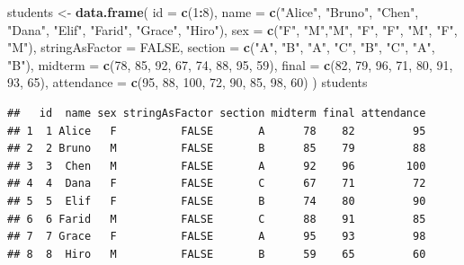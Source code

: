 \documentclass[
]{article}
\newenvironment{Shaded}{\begin{snugshade}}{\end{snugshade}}
\newcommand{\AttributeTok}[1]{\textcolor[rgb]{0.13,0.29,0.53}{#1}}
\newcommand{\ConstantTok}[1]{\textcolor[rgb]{0.56,0.35,0.01}{#1}}
\newcommand{\DecValTok}[1]{\textcolor[rgb]{0.00,0.00,0.81}{#1}}
\newcommand{\FunctionTok}[1]{\textcolor[rgb]{0.13,0.29,0.53}{\textbf{#1}}}
\newcommand{\NormalTok}[1]{#1}
\newcommand{\OtherTok}[1]{\textcolor[rgb]{0.56,0.35,0.01}{#1}}
\newcommand{\SpecialCharTok}[1]{\textcolor[rgb]{0.81,0.36,0.00}{\textbf{#1}}}
\newcommand{\StringTok}[1]{\textcolor[rgb]{0.31,0.60,0.02}{#1}}
\begin{document}
\begin{Shaded}
\begin{Highlighting}[]
\NormalTok{students }\OtherTok{\textless{}{-}} \FunctionTok{data.frame}\NormalTok{(}
  \AttributeTok{id =} \FunctionTok{c}\NormalTok{(}\DecValTok{1}\SpecialCharTok{:}\DecValTok{8}\NormalTok{),}
  \AttributeTok{name =} \FunctionTok{c}\NormalTok{(}\StringTok{"Alice"}\NormalTok{, }\StringTok{"Bruno"}\NormalTok{, }\StringTok{"Chen"}\NormalTok{, }\StringTok{"Dana"}\NormalTok{, }\StringTok{"Elif"}\NormalTok{, }\StringTok{"Farid"}\NormalTok{, }\StringTok{"Grace"}\NormalTok{, }\StringTok{"Hiro"}\NormalTok{),}
  \AttributeTok{sex =} \FunctionTok{c}\NormalTok{(}\StringTok{"F"}\NormalTok{, }\StringTok{"M"}\NormalTok{,}\StringTok{"M"}\NormalTok{,  }\StringTok{"F"}\NormalTok{, }\StringTok{"F"}\NormalTok{, }\StringTok{"M"}\NormalTok{, }\StringTok{"F"}\NormalTok{, }\StringTok{"M"}\NormalTok{), }\AttributeTok{stringAsFactor =} \ConstantTok{FALSE}\NormalTok{, }
  \AttributeTok{section =} \FunctionTok{c}\NormalTok{(}\StringTok{"A"}\NormalTok{, }\StringTok{"B"}\NormalTok{, }\StringTok{"A"}\NormalTok{, }\StringTok{"C"}\NormalTok{, }\StringTok{"B"}\NormalTok{, }\StringTok{"C"}\NormalTok{, }\StringTok{"A"}\NormalTok{, }\StringTok{"B"}\NormalTok{),}
  \AttributeTok{midterm =} \FunctionTok{c}\NormalTok{(}\DecValTok{78}\NormalTok{, }\DecValTok{85}\NormalTok{, }\DecValTok{92}\NormalTok{, }\DecValTok{67}\NormalTok{, }\DecValTok{74}\NormalTok{, }\DecValTok{88}\NormalTok{, }\DecValTok{95}\NormalTok{, }\DecValTok{59}\NormalTok{),}
  \AttributeTok{final =} \FunctionTok{c}\NormalTok{(}\DecValTok{82}\NormalTok{, }\DecValTok{79}\NormalTok{, }\DecValTok{96}\NormalTok{, }\DecValTok{71}\NormalTok{, }\DecValTok{80}\NormalTok{, }\DecValTok{91}\NormalTok{, }\DecValTok{93}\NormalTok{, }\DecValTok{65}\NormalTok{),}
  \AttributeTok{attendance =} \FunctionTok{c}\NormalTok{(}\DecValTok{95}\NormalTok{, }\DecValTok{88}\NormalTok{, }\DecValTok{100}\NormalTok{, }\DecValTok{72}\NormalTok{, }\DecValTok{90}\NormalTok{, }\DecValTok{85}\NormalTok{, }\DecValTok{98}\NormalTok{, }\DecValTok{60}\NormalTok{)}
\NormalTok{)}
\NormalTok{students}
\end{Highlighting}
\end{Shaded}

\begin{verbatim}
##   id  name sex stringAsFactor section midterm final attendance
## 1  1 Alice   F          FALSE       A      78    82         95
## 2  2 Bruno   M          FALSE       B      85    79         88
## 3  3  Chen   M          FALSE       A      92    96        100
## 4  4  Dana   F          FALSE       C      67    71         72
## 5  5  Elif   F          FALSE       B      74    80         90
## 6  6 Farid   M          FALSE       C      88    91         85
## 7  7 Grace   F          FALSE       A      95    93         98
## 8  8  Hiro   M          FALSE       B      59    65         60
\end{verbatim}
\end{document}
